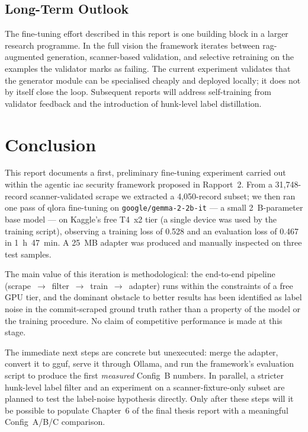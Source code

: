 \documentclass[12pt, a4paper]{report}
\begin{document}
\section{Long-Term Outlook}

The fine-tuning effort described in this report is one building block
in a larger research programme. In the full vision the framework
iterates between \gls{rag}-augmented generation, scanner-based
validation, and selective retraining on the examples the validator
marks as failing. The current experiment validates that the generator
module can be specialised cheaply and deployed locally; it does not by
itself close the loop. Subsequent reports will address self-training
from validator feedback and the introduction of hunk-level label
distillation.

\chapter{Conclusion}

This report documents a first, preliminary fine-tuning experiment
carried out within the agentic \gls{iac} security framework proposed in
Rapport~2. From a 31{,}748-record scanner-validated scrape we extracted
a 4{,}050-record subset; we then ran one pass of \gls{qlora} fine-tuning
on \texttt{google/gemma-2-2b-it} --- a small 2~B-parameter base model
--- on Kaggle's free T4~x2 tier (a single device was used by the
training script), observing a training loss of 0.528 and an
evaluation loss of 0.467 in 1~h~47~min. A 25~MB adapter was produced
and manually inspected on three test samples.

The main value of this iteration is methodological: the end-to-end
pipeline (scrape~$\to$~filter~$\to$~train~$\to$~adapter) runs within
the constraints of a free GPU tier, and the dominant obstacle to better
results has been identified as label noise in the commit-scraped
ground truth rather than a property of the model or the training
procedure. No claim of competitive performance is made at this stage.

The immediate next steps are concrete but unexecuted: merge the adapter,
convert it to \gls{gguf}, serve it through Ollama, and run the
framework's evaluation script to produce the first \emph{measured}
Config~B numbers. In parallel, a stricter hunk-level label filter and
an experiment on a scanner-fixture-only subset are planned to test the
label-noise hypothesis directly. Only after these steps will it be
possible to populate Chapter~6 of the final thesis report with a
meaningful Config~A/B/C comparison.
\end{document}
